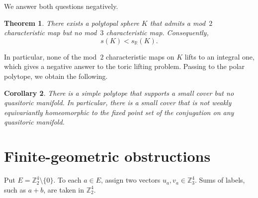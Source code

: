 \documentclass{amsart}
\theoremstyle{plain}
\newtheorem{theorem}{Theorem}[section]
\newtheorem{corollary}[theorem]{Corollary}
\numberwithin{equation}{section}
\theoremstyle{remark}
\theoremstyle{definition}
\newcommand{\Z}{\mathbb Z}
\newcommand{\R}{\mathbb R}
\begin{document}
We answer both questions negatively.

\begin{theorem}\label{thm:main}
    There exists a polytopal sphere $K$ that admits a mod~$2$ characteristic map but no mod~$3$ characteristic map. 
    Consequently, 
    $$
        s(K) < s_{\R}(K).
    $$
\end{theorem}

In particular, none of the mod~$2$ characteristic maps on $K$ lifts to an integral one, which gives a negative answer to the toric lifting problem. 
Passing to the polar polytope, we obtain the following.

\begin{corollary}\label{cor:polytope}
    There is a simple polytope that supports a small cover but no quasitoric manifold.
    In particular, there is a small cover that is not weakly equivariantly homeomorphic to the fixed point set of the conjugation on any quasitoric manifold.
\end{corollary}


\section{Finite-geometric obstructions} \label{sec:alg_lem}
Put $E=\Z_2^4\setminus\{0\}$.
To each $a\in E$, assign two vectors $u_a, v_a\in\Z_3^4$.
Sums of labels, such as $a+b$, are taken in $\Z_2^4$.
\end{document}
